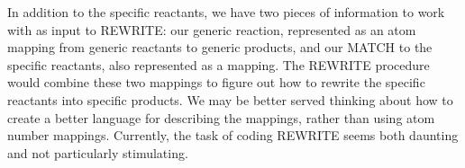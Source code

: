 
\vspace{.1in}

In addition to the specific reactants, we have two pieces of information
to work with as input to REWRITE: our generic reaction, represented
as an atom mapping from generic reactants to generic products, and
our MATCH to the specific reactants, also represented as a mapping.
The REWRITE procedure would combine these two mappings to figure out
how to rewrite the specific reactants into specific products. We may
be better served thinking about how to create a better language for
describing the mappings, rather than using atom number mappings. Currently,
the task of coding REWRITE seems both daunting and not particularly
stimulating. 

